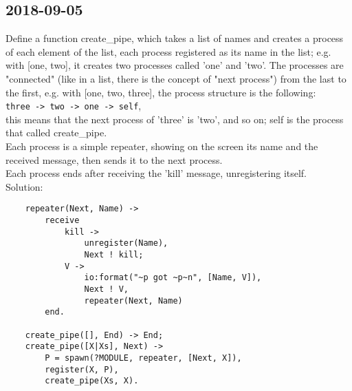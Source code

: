 \subsection{2018-09-05}
Define a function create\_pipe, which takes a list of names and creates a process of each element of the list,
each process registered as its name in the list; e.g. with [one, two], it creates two processes called 'one' and
'two'. The processes are "connected" (like in a list, there is the concept of "next process") from the last to the first,
e.g. with [one, two, three], the process structure is the following: \\
\texttt{three -> two -> one -> self}, \\
this means that the next process of 'three' is 'two', and so on; self is the process that called create\_pipe.\\
Each process is a simple repeater, showing on the screen its name and the received message, then sends it to
the next process.\\
Each process ends after receiving the 'kill' message, unregistering itself.\\
Solution:
\begin{lstlisting}
    repeater(Next, Name) ->
        receive
            kill ->
                unregister(Name),
                Next ! kill;
            V ->
                io:format("~p got ~p~n", [Name, V]),
                Next ! V,
                repeater(Next, Name)
        end.

    create_pipe([], End) -> End;
    create_pipe([X|Xs], Next) ->
        P = spawn(?MODULE, repeater, [Next, X]),
        register(X, P),
        create_pipe(Xs, X).
\end{lstlisting}

